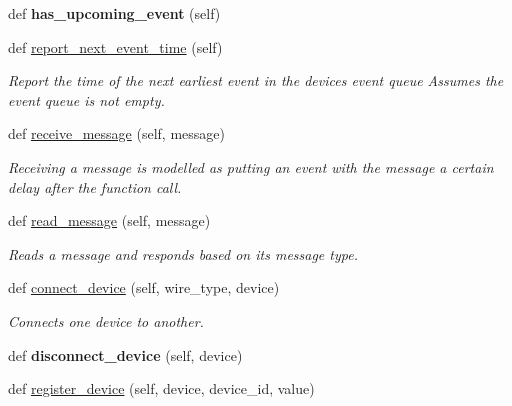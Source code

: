 \begin{DoxyCompactItemize}
\mbox{\label{class_build_1_1_objects_1_1device_1_1_device_ad06156227c33b40f30bcfbc7ae7508b1}} 
def {\bfseries has\+\_\+upcoming\+\_\+event} (self)
\item 
def \hyperlink{class_build_1_1_objects_1_1device_1_1_device_a5e3fa6ca689529fcf25650e94dcedc62}{report\+\_\+next\+\_\+event\+\_\+time} (self)
\begin{DoxyCompactList}\small\item\em Report the time of the next earliest event in the device\textquotesingle{}s event queue Assumes the event queue is not empty. \end{DoxyCompactList}\item 
def \hyperlink{class_build_1_1_objects_1_1device_1_1_device_a015f4cfeb779c8c6338c65bab7e314ec}{receive\+\_\+message} (self, message)
\begin{DoxyCompactList}\small\item\em Receiving a message is modelled as putting an event with the message a certain delay after the function call. \end{DoxyCompactList}\item 
def \hyperlink{class_build_1_1_objects_1_1device_1_1_device_a65e13b5bb4b33acdd37a084167829056}{read\+\_\+message} (self, message)
\begin{DoxyCompactList}\small\item\em Reads a message and responds based on its message type. \end{DoxyCompactList}\item 
\mbox{\label{class_build_1_1_objects_1_1device_1_1_device_afdb3d3a5fc6220f50c025cd0cfed306d}} 
def \hyperlink{class_build_1_1_objects_1_1device_1_1_device_afdb3d3a5fc6220f50c025cd0cfed306d}{connect\+\_\+device} (self, wire\+\_\+type, device)
\begin{DoxyCompactList}\small\item\em Connects one device to another. \end{DoxyCompactList}\item 
\mbox{\label{class_build_1_1_objects_1_1device_1_1_device_ae349c3bea0d657c805dda47748572dc0}} 
def {\bfseries disconnect\+\_\+device} (self, device)
\item 
def \hyperlink{class_build_1_1_objects_1_1device_1_1_device_a8ff05d4817a653460ef0873554e3ac87}{register\+\_\+device} (self, device, device\+\_\+id, value)

\end{DoxyCompactItemize}
